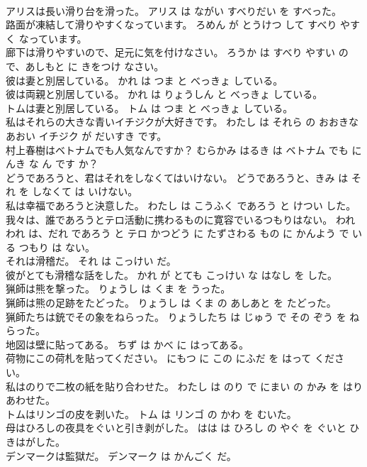 \documentclass[8pt]{extreport}
\begin{document}
\begin{CJK}{UTF8}{min}
\\	アリスは長い滑り台を滑った。	アリス は ながい すべりだい を すべった。	
\\	路面が凍結して滑りやすくなっています。	ろめん が とうけつ して すべり やすく なっています。	
\\	廊下は滑りやすいので、足元に気を付けなさい。	ろうか は すべり やすい ので、あしもと に きをつけ なさい。	
\\	彼は妻と別居している。	かれ は つま と べっきょ している。	
\\	彼は両親と別居している。	かれ は りょうしん と べっきょ している。	
\\	トムは妻と別居している。	トム は つま と べっきょ している。	
\\	私はそれらの大きな青いイチジクが大好きです。	わたし は それら の おおきな あおい イチジク が だいすき です。	
\\	村上春樹はベトナムでも人気なんですか？	むらかみ はるき は ベトナム でも にんき な ん です か？	
\\	どうであろうと、君はそれをしなくてはいけない。	どうであろうと、きみ は それ を しなくて は いけない。	
\\	私は幸福であろうと決意した。	わたし は こうふく であろう と けつい した。	
\\	我々は、誰であろうとテロ活動に携わるものに寛容でいるつもりはない。	われわれ は、だれ であろう と テロ かつどう に たずさわる もの に かんよう で いる つもり は ない。	
\\	それは滑稽だ。	それ は こっけい だ。	
\\	彼がとても滑稽な話をした。	かれ が とても こっけい な はなし を した。	
\\	猟師は熊を撃った。	りょうし は くま を うった。	
\\	猟師は熊の足跡をたどった。	りょうし は くま の あしあと を たどった。	
\\	猟師たちは銃でその象をねらった。	りょうしたち は じゅう で その ぞう を ねらった。	
\\	地図は壁に貼ってある。	ちず は かべ に はってある。	
\\	荷物にこの荷札を貼ってください。	にもつ に この にふだ を はって ください。	
\\	私はのりで二枚の紙を貼り合わせた。	わたし は のり で にまい の かみ を はりあわせた。	
\\	トムはリンゴの皮を剥いた。	トム は リンゴ の かわ を むいた。	
\\	母はひろしの夜具をぐいと引き剥がした。	はは は ひろし の やぐ を ぐいと ひきはがした。	
\\	デンマークは監獄だ。	デンマーク は かんごく だ。	

\end{CJK}
\end{document}
